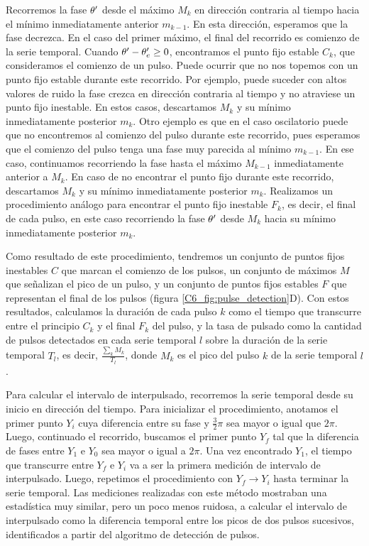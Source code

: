 \documentclass[./main.tex]{subfiles}
\begin{document}
Recorremos la fase $\theta'$ desde el máximo $M_k$ en dirección contraria al tiempo hacia el mínimo inmediatamente anterior $m_{k-1}$. En esta dirección, esperamos que la fase \xx decrezca. En el caso del primer máximo, el final del recorrido es comienzo de la serie temporal. Cuando $\theta' - \theta_e' \geq 0$, encontramos el punto fijo estable $C_k$, que consideramos el comienzo de un pulso. Puede ocurrir que no nos topemos con un punto fijo estable durante este recorrido. Por ejemplo, puede suceder con altos valores de ruido la fase crezca en dirección contraria al tiempo y no atraviese un punto fijo inestable. En estos casos, descartamos $M_k$ y su mínimo inmediatamente posterior $m_k$. Otro ejemplo es que en el caso oscilatorio puede que no encontremos al comienzo del pulso durante este recorrido, pues esperamos que el comienzo del pulso tenga una fase muy parecida al mínimo $m_{k-1}$. En ese caso, continuamos recorriendo la fase hasta el máximo $M_{k-1}$ inmediatamente anterior a $M_k$. En caso de no encontrar el punto fijo durante este recorrido, descartamos $M_k$ y su mínimo inmediatamente posterior $m_k$. Realizamos un procedimiento análogo para encontrar el punto fijo inestable $F_k$, es decir, el final de cada pulso, en este caso recorriendo la fase $\theta'$ desde $M_k$ hacia su mínimo inmediatamente posterior $m_k$.


Como resultado de este procedimiento, tendremos un conjunto de puntos fijos inestables $C$ que marcan el comienzo de los pulsos, un conjunto de máximos $M$ que señalizan el pico de un pulso, y un conjunto de puntos fijos estables $F$ que representan el final de los pulsos (figura \ref{C6_fig:pulse_detection}D). Con estos resultados, calculamos la duración de cada pulso $k$ como el tiempo que transcurre entre el principio $C_k$ y el final $F_k$ del pulso, y la tasa de pulsado como la cantidad de pulsos detectados en cada serie temporal $l$ sobre la duración de la serie temporal $T_l$, es decir, $\frac{\sum_k M_k}{T_l}$, donde $M_k$ es el pico del pulso $k$ de la serie temporal $l$. 


Para calcular el intervalo de interpulsado, recorremos la serie temporal desde su inicio en dirección del tiempo. Para inicializar el procedimiento, anotamos el primer punto $Y_i$ cuya diferencia entre su fase y $\frac{3}{2}\pi$ sea mayor o igual que $2\pi$. Luego, continuado el recorrido, buscamos el primer punto $Y_f$ tal que la diferencia de fases entre $Y_1$ e $Y_0$ sea mayor o igual a $2\pi$. Una vez encontrado $Y_1$, el tiempo que transcurre entre $Y_f$ e $Y_i$ va a ser la primera medición de intervalo de interpulsado. Luego, repetimos el procedimiento  con $Y_f \rightarrow Y_i$ hasta terminar la serie temporal. Las mediciones realizadas con este método mostraban una estadística muy similar, pero un poco menos ruidosa, a calcular el intervalo de interpulsado como la diferencia temporal entre los picos de dos pulsos sucesivos, identificados a partir del algoritmo de detección de pulsos.  
\end{document}
